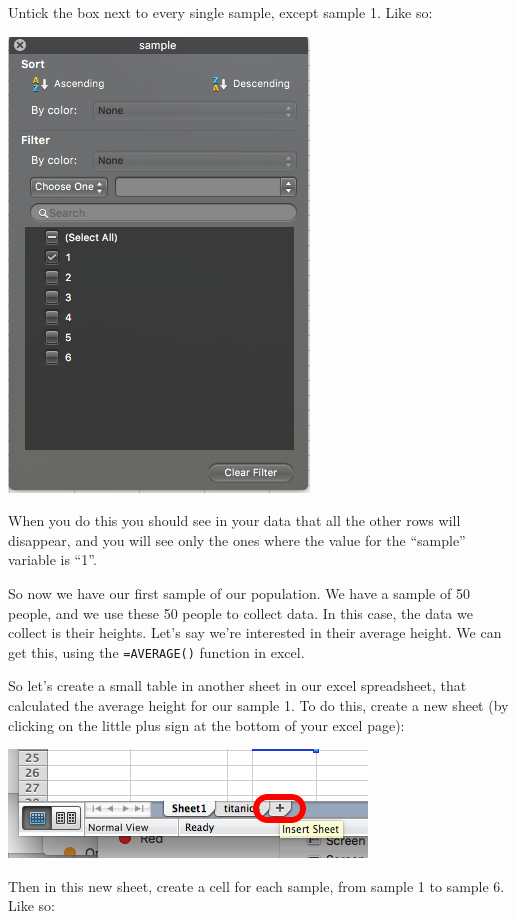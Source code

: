 \documentclass[]{book}
\theoremstyle{definition}
\theoremstyle{definition}
\theoremstyle{definition}
\theoremstyle{remark}
\begin{document}
Untick the box next to every single sample, except sample 1. Like so:

\includegraphics{imgs/filter_sample_1.png}

When you do this you should see in your data that all the other rows
will disappear, and you will see only the ones where the value for the
``sample'' variable is ``1''.

So now we have our first sample of our population. We have a sample of
50 people, and we use these 50 people to collect data. In this case, the
data we collect is their heights. Let's say we're interested in their
average height. We can get this, using the \texttt{=AVERAGE()} function
in excel.

So let's create a small table in another sheet in our excel spreadsheet,
that calculated the average height for our sample 1. To do this, create
a new sheet (by clicking on the little plus sign at the bottom of your
excel page):

\includegraphics{imgs/new_sheet_2.png}

Then in this new sheet, create a cell for each sample, from sample 1 to
sample 6. Like so:
\end{document}
